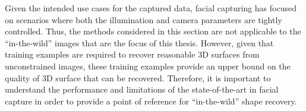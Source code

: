 Given the intended use cases for the captured data, facial capturing has focused
on scenarios where both the illumination and camera parameters are tightly
controlled. Thus, the methods considered in this section are not applicable
to the ``in-the-wild'' images that are the focus of this thesis. However,
given that training examples are required to recover reasonable 3D surfaces
from unconstrained images, these training examples provide an upper bound
on the quality of 3D surface that can be recovered. Therefore, it is important
to understand the performance and limitations of the state-of-the-art in
facial capture in order to provide a point of reference for ``in-the-wild''
shape recovery.
\begin{table}
\centering
{}
\end{table}
